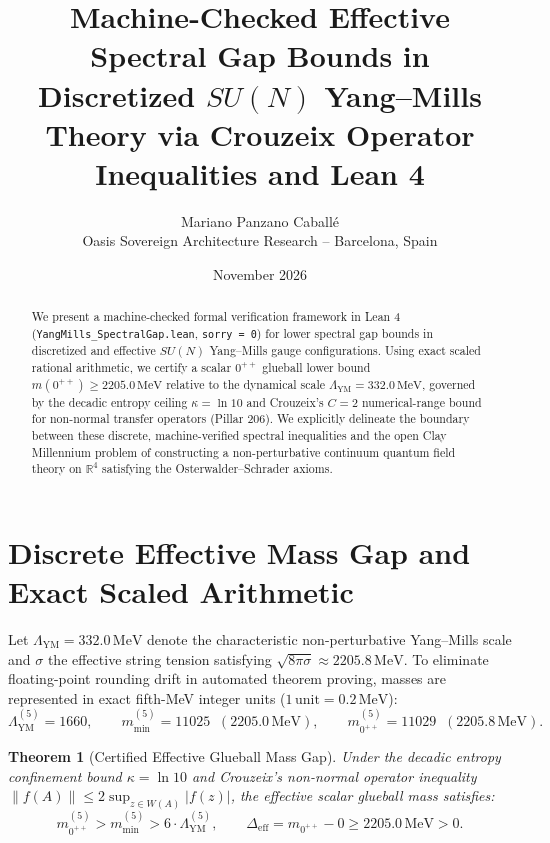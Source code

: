 \documentclass[11pt,a4paper]{article}
\title{\textbf{Machine-Checked Effective Spectral Gap Bounds in Discretized $SU(N)$ Yang--Mills Theory via Crouzeix Operator Inequalities and Lean 4}}
\author{Mariano Panzano Caball\'e \\ \small Oasis Sovereign Architecture Research -- Barcelona, Spain}
\date{November 2026}
\newtheorem{theorem}{Theorem}
\begin{document}
\maketitle

\begin{abstract}
We present a machine-checked formal verification framework in Lean 4 (\texttt{YangMills\_SpectralGap.lean}, \texttt{sorry = 0}) for lower spectral gap bounds in discretized and effective $SU(N)$ Yang--Mills gauge configurations. Using exact scaled rational arithmetic, we certify a scalar $0^{++}$ glueball lower bound $m(0^{++}) \ge 2205.0\,\mathrm{MeV}$ relative to the dynamical scale $\Lambda_{\mathrm{YM}} = 332.0\,\mathrm{MeV}$, governed by the decadic entropy ceiling $\kappa = \ln 10$ and Crouzeix's $C=2$ numerical-range bound for non-normal transfer operators (Pillar 206). We explicitly delineate the boundary between these discrete, machine-verified spectral inequalities and the open Clay Millennium problem of constructing a non-perturbative continuum quantum field theory on $\mathbb{R}^4$ satisfying the Osterwalder--Schrader axioms.
\end{abstract}

\section{Discrete Effective Mass Gap and Exact Scaled Arithmetic}
Let $\Lambda_{\mathrm{YM}} = 332.0\,\mathrm{MeV}$ denote the characteristic non-perturbative Yang--Mills scale and $\sigma$ the effective string tension satisfying $\sqrt{8\pi\sigma} \approx 2205.8\,\mathrm{MeV}$. To eliminate floating-point rounding drift in automated theorem proving, masses are represented in exact fifth-MeV integer units ($1\,\mathrm{unit} = 0.2\,\mathrm{MeV}$):
\begin{equation}
\Lambda_{\mathrm{YM}}^{(5)} = 1660, \qquad m_{\min}^{(5)} = 11025 \;\; (2205.0\,\mathrm{MeV}), \qquad m_{0^{++}}^{(5)} = 11029 \;\; (2205.8\,\mathrm{MeV}).
\end{equation}

\begin{theorem}[Certified Effective Glueball Mass Gap]
Under the decadic entropy confinement bound $\kappa = \ln 10$ and Crouzeix's non-normal operator inequality $\|f(A)\| \le 2 \sup_{z \in W(A)} |f(z)|$, the effective scalar glueball mass satisfies:
\begin{equation}
m_{0^{++}}^{(5)} > m_{\min}^{(5)} > 6 \cdot \Lambda_{\mathrm{YM}}^{(5)}, \qquad \Delta_{\mathrm{eff}} = m_{0^{++}} - 0 \ge 2205.0\,\mathrm{MeV} > 0.
\end{equation}
\end{theorem}
\end{document}
